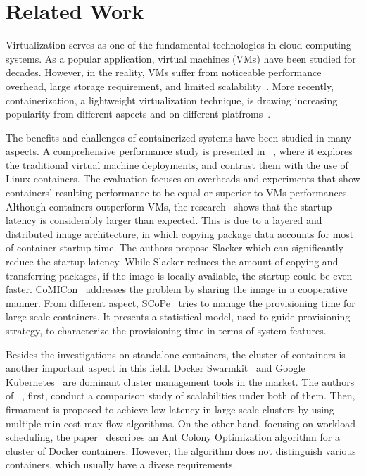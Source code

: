 \section{Related Work}
Virtualization serves as one of the fundamental technologies in cloud computing systems. 
As a popular application, virtual machines (VMs) have been studied for decades.
However, in the reality, VMs suffer from noticeable
performance overhead, large storage requirement, and limited scalability~\cite{xu2014managing}.
More recently, containerization, a lightweight virtualization technique,  
is drawing increasing popularity from different aspects and on different 
platfroms~\cite{secpod, men2012interface, 
cheng2014efficiently, cheng2013qbdj, cheng2016efficient, cheng2014efficient, edos, bhimani2016, bhimani2017,tang2012gpu, du2015gpu, zhao2012mesh}.

The benefits and challenges of containerized systems have been studied in many aspects.
A comprehensive performance study is presented in ~\cite{felter2015updated}, where it explores the traditional
virtual machine deployments, and contrast them with the use
of Linux containers. The evaluation focuses on overheads and experiments 
that show containers' resulting performance to be equal or superior to VMs performances.
Although containers outperform VMs, 
the research~\cite{slacker} shows that the startup latency is considerably larger than expected.
This is due to a layered and distributed image architecture, in which copying package data accounts
for most of container startup time. The authors propose Slacker which can significantly reduce the startup latency.
While Slacker reduces the amount of copying and transferring packages, if the image is locally available, the
startup could be even faster. CoMICon~\cite{nathan2017comicon} addresses the problem by sharing the image in a cooperative manner. From different aspect, SCoPe~\cite{scope} tries to manage the provisioning time for large scale containers. 
It presents a statistical model, used to guide provisioning strategy, to characterize the provisioning time in terms of system features.

Besides the investigations on standalone containers, the cluster of containers is another important aspect in this field.
Docker Swarmkit~\cite{swarmkit} and Google Kubernetes~\cite{bernstein2014containers} are dominant cluster management tools in the market.
The authors of ~\cite{gog2016firmament}, first, conduct a comparison study of scalabilities under both of them. Then, firmament is proposed 
to achieve low latency in large-scale clusters by using multiple min-cost max-flow algorithms. 
On the other hand, focusing on workload scheduling, the paper~\cite{kaewkasi2017improvement} describes an Ant Colony Optimization algorithm
for a cluster of Docker containers. However, the algorithm does not distinguish various containers, which usually have a divese requirements. 

